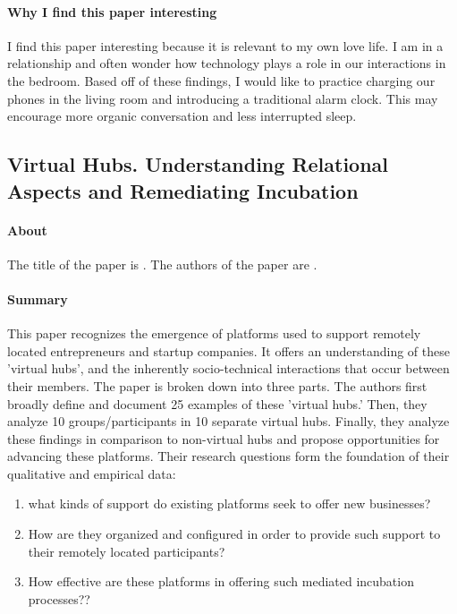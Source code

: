 \paragraph{Why I find this paper interesting}
I find this paper interesting because it is relevant to my own love life. I am in a relationship and often wonder how technology plays a role in our interactions in the bedroom. Based off of these findings, I would like to practice charging our phones in the living room and introducing a traditional alarm clock. This may encourage more organic conversation and less interrupted sleep.

\subsection{Virtual Hubs. Understanding Relational Aspects and Remediating Incubation}

\paragraph{About}
The title of the paper is . The authors of the paper are .

\paragraph{Summary}
This paper recognizes the emergence of platforms used to support remotely located entrepreneurs and startup companies. It offers an understanding of these 'virtual hubs', and the inherently socio-technical interactions that occur between their members. The paper is broken down into three parts. The authors first broadly define and document 25 examples of these 'virtual hubs.' Then, they analyze 10 groups/participants in 10 separate virtual hubs. Finally, they analyze these findings in comparison to non-virtual hubs and propose opportunities for advancing these platforms. Their research questions form the foundation of their qualitative and empirical data:

\begin{enumerate}
\item
  what kinds of support do existing platforms seek to offer new businesses?
\item
  How are they organized and configured in order to provide such support to their remotely located participants?
\item
  How effective are these platforms in offering such mediated incubation processes??
\end{enumerate}

